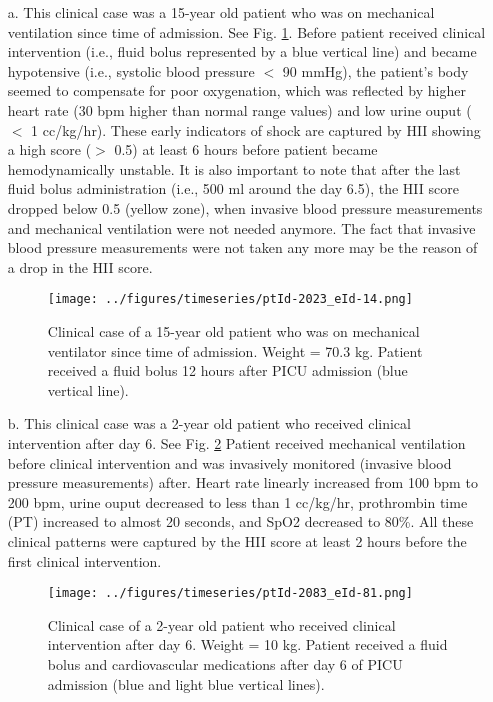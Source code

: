 \documentclass[
   technote
]{phildoc}
\newcommand{\ie}{i.e.,}
\newcommand{\hii}{HII}
\newcommand{\fig}{Fig.}
\begin{document}
\begin{itemize}

\item [a.] This clinical case was a 15-year old patient who was on mechanical ventilation since time of admission. See \fig{} \ref{fig:clinical_case_ptId2023}. Before patient received clinical intervention (\ie{} fluid bolus represented by a blue vertical line) and became hypotensive (\ie{} systolic blood pressure $<$ 90 mmHg), the patient's body seemed to compensate for poor oxygenation, which was reflected by higher heart rate (30 bpm higher than normal range values) and low urine ouput ($<$ 1 cc/kg/hr). These early indicators of shock are captured by \hii{} showing a high score ($>$ 0.5) at least $6$ hours before patient became hemodynamically unstable. It is also important to note that after the last fluid bolus administration (\ie{} 500 ml around the day 6.5), the \hii{} score dropped below 0.5 (yellow zone), when invasive blood pressure measurements and mechanical ventilation were not needed anymore. The fact that invasive blood pressure measurements were not taken any more may be the reason of a drop in the \hii{} score.  

\begin{figure}[h!]
	\centering
	\texttt{[image: ../figures/timeseries/ptId-2023\_eId-14.png]}
	\caption{Clinical case of a 15-year old patient who was on mechanical ventilator since time of admission. Weight = 70.3 kg. Patient received a fluid bolus 12 hours after PICU admission (blue vertical line).} 
	\label{fig:clinical_case_ptId2023}      
\end{figure}

\item[b.] This clinical case was a 2-year old patient who received clinical intervention after day 6. See \fig{} \ref{fig:clinical_case_ptId2083}  Patient received mechanical ventilation before clinical intervention and was invasively monitored (invasive blood pressure measurements) after. Heart rate linearly increased from 100 bpm to 200 bpm, urine ouput decreased to less than 1 cc/kg/hr, prothrombin time (PT) increased to almost 20 seconds, and SpO2 decreased to 80\%. All these clinical patterns were captured by the \hii{} score at least 2 hours before the first clinical intervention.

\begin{figure}[h!]
	\centering
	\texttt{[image: ../figures/timeseries/ptId-2083\_eId-81.png]}
	\caption{Clinical case of a 2-year old patient who received clinical intervention after day 6. Weight = 10 kg. Patient received a fluid bolus and cardiovascular medications after day 6 of PICU admission (blue and light blue vertical lines).} 
	\label{fig:clinical_case_ptId2083}      
\end{figure}
    


\end{itemize}
\end{document}
